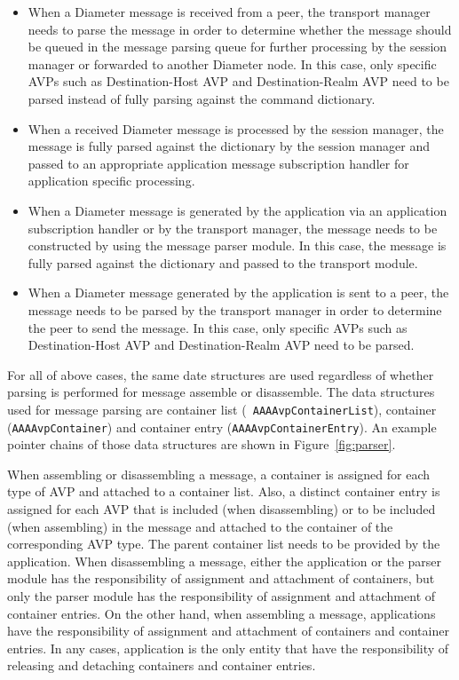 \documentclass{article}
\begin{document}
\begin{itemize}
 \item When a Diameter message is received from a peer, the transport
 manager needs to parse the message in order to determine whether the
 message should be queued in the message parsing queue for further
 processing by the session manager or forwarded to another Diameter
 node.  In this case, only specific AVPs such as Destination-Host AVP
 and Destination-Realm AVP need to be parsed instead of fully parsing
 against the command dictionary.
 \item When a received Diameter message is processed by the session
 manager, the message is fully parsed against the dictionary by the
 session manager and passed to an appropriate application message
 subscription handler for application specific processing.
 \item When a Diameter message is generated by the application via an
 application subscription handler or by the transport manager, the
 message needs to be constructed by using the message parser module.  In
 this case, the message is fully parsed against the dictionary and
 passed to the transport module.
 \item When a Diameter message generated by the application is sent to a
 peer, the message needs to be parsed by the transport manager in order
 to determine the peer to send the message.  In this case, only specific
 AVPs such as Destination-Host AVP and Destination-Realm AVP need to
 be parsed.
\end{itemize}

For all of above cases, the same date structures are used regardless of
whether parsing is performed for message assemble or disassemble.  The
data structures used for message parsing are container list ({\tt
AAAAvpContainerList}), container\\ ({\tt AAAAvpContainer}) and container
entry ({\tt AAAAvpContainerEntry}).  An example pointer chains of those
data structures are shown in Figure~\ref{fig:parser}.

When assembling or disassembling a message, a container is assigned for
each type of AVP and attached to a container list.  Also, a distinct
container entry is assigned for each AVP that is included (when
disassembling) or to be included (when assembling) in the message and
attached to the container of the corresponding AVP type.  The parent
container list needs to be provided by the application.  When
disassembling a message, either the application or the parser module has
the responsibility of assignment and attachment of containers, but only
the parser module has the responsibility of assignment and attachment of
container entries.  On the other hand, when assembling a message,
applications have the responsibility of assignment and attachment of
containers and container entries.  In any cases, application is the only
entity that have the responsibility of releasing and detaching
containers and container entries.
\end{document}
